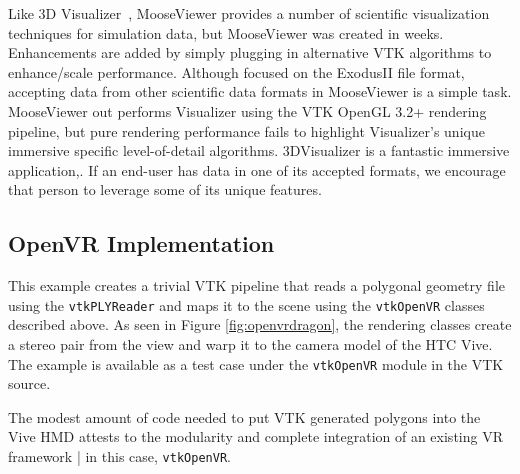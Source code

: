 Like 3D Visualizer~\cite{Billen:2008}, MooseViewer provides a number of scientific visualization techniques for simulation data, but MooseViewer was created in weeks. Enhancements are added by simply plugging in alternative VTK algorithms to enhance/scale performance.  Although focused on the ExodusII file format, accepting data from other scientific data formats in MooseViewer is a simple task. MooseViewer out performs Visualizer using the VTK OpenGL 3.2+ rendering pipeline, but pure rendering performance fails to highlight Visualizer's unique immersive specific level-of-detail algorithms. 3DVisualizer is a fantastic immersive application,. If an end-user has data in one of its accepted formats, we encourage that person to leverage some of its unique features.


\subsection{OpenVR Implementation}

This example creates a trivial VTK pipeline that reads a polygonal geometry file
using the \texttt{vtkPLYReader} and maps it to the scene using the \texttt{vtkOpenVR}
classes described above. As seen in Figure \ref{fig:openvrdragon}, the rendering
classes create a stereo pair from the view and warp it to the camera model of
the HTC Vive. 
The example is available as a test case under the
\texttt{vtkOpenVR} module in the VTK source.

The modest amount of code needed to put VTK generated polygons into the
Vive HMD attests to the modularity and complete integration of an
existing VR framework | in this case, \texttt{vtkOpenVR}.